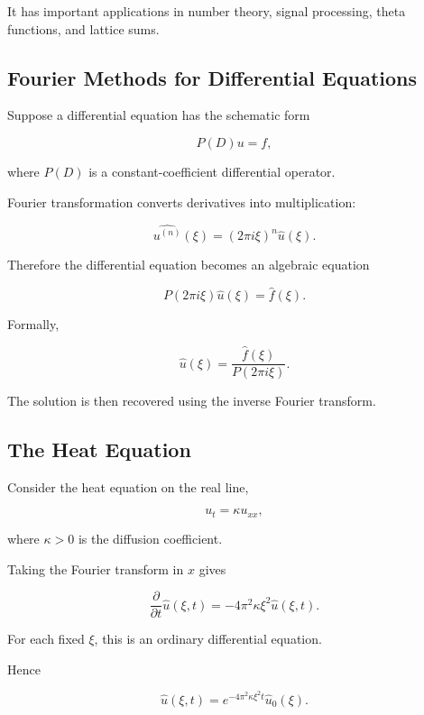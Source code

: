 It has important applications in number theory, signal processing,
theta functions, and lattice sums.

\subsection{Fourier Methods for Differential Equations}
\label{subsec:fourier-differential-equations}

Suppose a differential equation has the schematic form

\[
P(D)u=f,
\]

where \(P(D)\) is a constant-coefficient differential operator.

Fourier transformation converts derivatives into multiplication:

\[
\widehat{u^{(n)}}(\xi)
=
(2\pi i\xi)^n\widehat{u}(\xi).
\]

Therefore the differential equation becomes an algebraic equation

\[
\boxed{
P(2\pi i\xi)\widehat{u}(\xi)
=
\widehat{f}(\xi).
}
\]

Formally,

\[
\boxed{
\widehat{u}(\xi)
=
\frac{\widehat{f}(\xi)}
{P(2\pi i\xi)}.
}
\]

The solution is then recovered using the inverse Fourier transform.

\subsection{The Heat Equation}
\label{subsec:fourier-heat-equation}

Consider the heat equation on the real line,

\[
\boxed{
u_t
=
\kappa u_{xx},
}
\]

where \(\kappa>0\) is the diffusion coefficient.

Taking the Fourier transform in \(x\) gives

\[
\frac{\partial}{\partial t}
\widehat{u}(\xi,t)
=
-4\pi^2\kappa\xi^2
\widehat{u}(\xi,t).
\]

For each fixed \(\xi\), this is an ordinary differential equation.

Hence

\[
\boxed{
\widehat{u}(\xi,t)
=
e^{-4\pi^2\kappa\xi^2t}
\widehat{u}_0(\xi).
}
\]

